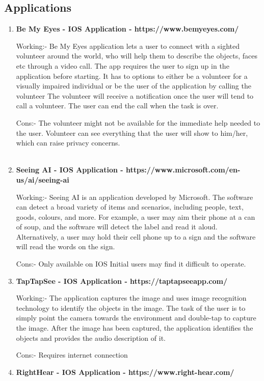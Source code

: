 \documentclass[MScCS]{uccthesis}
\begin{document}
\subsection{Applications}
\begin{enumerate}
    \item \textbf{Be My Eyes - IOS Application - https://www.bemyeyes.com/}

Working:-
Be My Eyes application lets a user to connect with a sighted volunteer around the world, who     will help them to describe the objects, faces etc through a video call. 
The app requires the user to sign up in the application before starting.
It has to options to either be a volunteer for a visually impaired  individual or be the user of the application by calling the volunteer
The volunteer will receive a notification once the user will tend to call a volunteer.
The user can end the call when the task is over.

Cons:-
The volunteer might not be available for the immediate help needed to the user.
Volunteer can see everything that the user will show to him/her, which can raise privacy concerns.
\\
\\\item \textbf{Seeing AI - IOS Application - https://www.microsoft.com/en-us/ai/seeing-ai}

Working:-
Seeing AI is an application developed by Microsoft.
The software can detect a broad variety of items and scenarios, including people, text, goods, colours, and more. For example, a user may aim their phone at a can of soup, and the software will detect the label and read it aloud. 
Alternatively, a user may hold their cell phone up to a sign and the software will read the words on the sign.

Cons:-
Only available on IOS
Initial users may find it difficult to operate.

\item \textbf{TapTapSee - IOS Application - https://taptapseeapp.com/}

Working:-
The application captures the image and uses image recognition technology to identify the objects in the image.
The task of the user is to simply point the camera towards the environment and double-tap to capture the image.
After the image has been captured, the application identifies the objects and provides the audio description of it.

Cons:-
Requires internet connection

\item \textbf{RightHear - IOS Application - https://www.right-hear.com/}


\end{enumerate}
\end{document}
